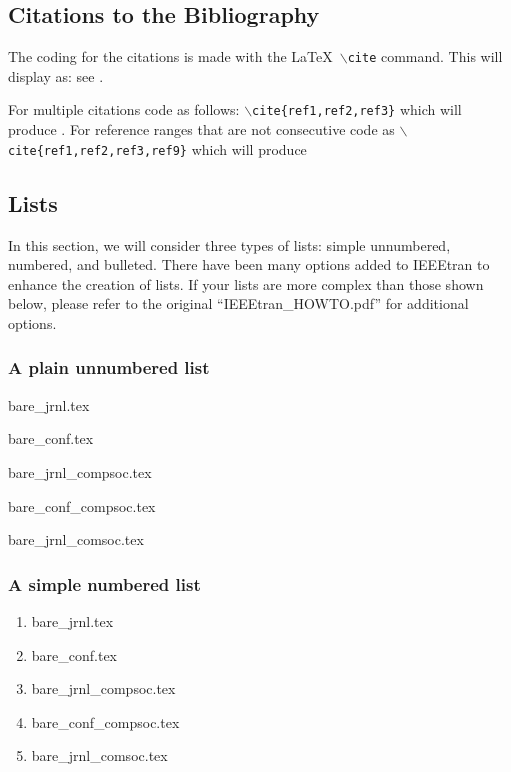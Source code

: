 \documentclass[lettersize,journal]{IEEEtran}
\begin{document}
\subsection{Citations to the Bibliography}
The coding for the citations is made with the \LaTeX\ $\backslash${\tt{cite}} command. 
This will display as: see \cite{IEEEexample:IEEEwebsite}.

For multiple citations code as follows: {\tt{$\backslash$cite\{ref1,ref2,ref3\}}}
 which will produce \cite{IEEEexample:IEEEwebsite}. For reference ranges that are not consecutive code as {\tt{$\backslash$cite\{ref1,ref2,ref3,ref9\}}} which will produce  \cite{ref1,ref2,ref3,ref9}

\subsection{Lists}
In this section, we will consider three types of lists: simple unnumbered, numbered, and bulleted. There have been many options added to IEEEtran to enhance the creation of lists. If your lists are more complex than those shown below, please refer to the original ``IEEEtran\_HOWTO.pdf'' for additional options.\\

\subsubsection*{\bf A plain  unnumbered list}
\begin{list}{}{}
\item{bare\_jrnl.tex}
\item{bare\_conf.tex}
\item{bare\_jrnl\_compsoc.tex}
\item{bare\_conf\_compsoc.tex}
\item{bare\_jrnl\_comsoc.tex}
\end{list}

\subsubsection*{\bf A simple numbered list}
\begin{enumerate}
\item{bare\_jrnl.tex}
\item{bare\_conf.tex}
\item{bare\_jrnl\_compsoc.tex}
\item{bare\_conf\_compsoc.tex}
\item{bare\_jrnl\_comsoc.tex}
\end{enumerate}
\end{document}
